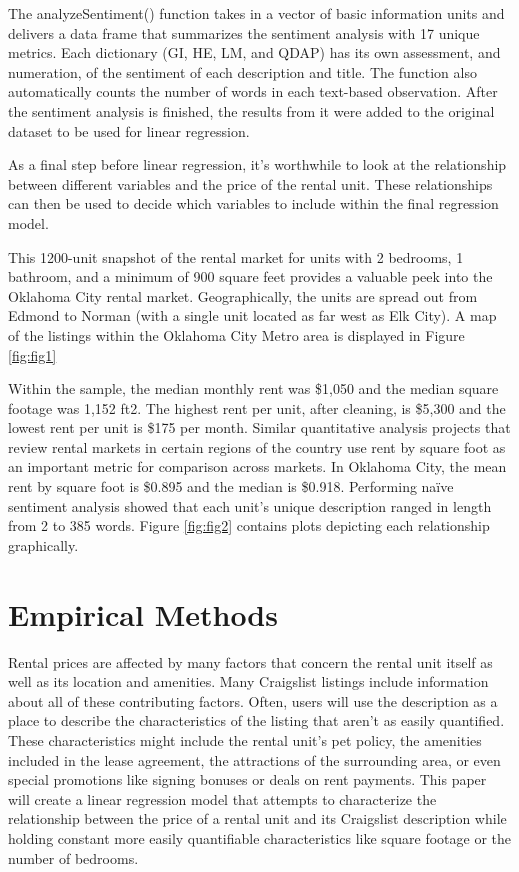 \documentclass[12pt,english]{article}
\begin{document}
The analyzeSentiment() function takes in a vector of basic information units and delivers a data frame that summarizes the sentiment analysis with 17 unique metrics. Each dictionary (GI, HE, LM, and QDAP) has its own assessment, and numeration, of the sentiment of each description and title.  The function also automatically counts the number of words in each text-based observation. After the sentiment analysis is finished, the results from it were added to the original dataset to be used for linear regression. 

As a final step before linear regression, it’s worthwhile to look at the relationship between different variables and the price of the rental unit. These relationships can then be used to decide which variables to include within the final regression model. 


This 1200-unit snapshot of the rental market for units with 2 bedrooms, 1 bathroom, and a minimum of 900 square feet provides a valuable peek into the Oklahoma City rental market. Geographically, the units are spread out from Edmond to Norman (with a single unit located as far west as Elk City). A map of the listings within the Oklahoma City Metro area is displayed in Figure \ref{fig:fig1} 

Within the sample, the median monthly rent was \$1,050 and the median square footage was 1,152 ft2. The highest rent per unit, after cleaning, is \$5,300 and the lowest rent per unit is \$175 per month. Similar quantitative analysis projects that review rental markets in certain regions of the country use rent by square foot as an important metric for comparison across markets. In Oklahoma City, the mean rent by square foot is \$0.895 and the median is \$0.918. Performing naïve sentiment analysis showed that each unit’s unique description ranged in length from 2 to 385 words. Figure \ref{fig:fig2} contains plots depicting each relationship graphically. 


\section{Empirical Methods}\label{sec:methods}

Rental prices are affected by many factors that concern the rental unit itself as well as its location and amenities. Many Craigslist listings include information about all of these contributing factors. Often, users will use the description as a place to describe the characteristics of the listing that aren’t as easily quantified. These characteristics might include the rental unit’s pet policy, the amenities included in the lease agreement, the attractions of the surrounding area, or even special promotions like signing bonuses or deals on rent payments. This paper will create a linear regression model that attempts to characterize the relationship between the price of a rental unit and its Craigslist description while holding constant more easily quantifiable characteristics like square footage or the number of bedrooms. 
\end{document}
